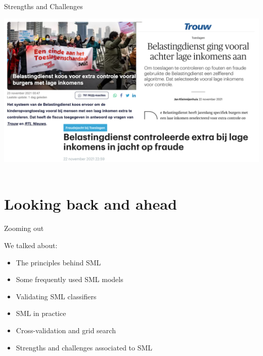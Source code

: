\documentclass[handout]{beamer}
\begin{document}
\begin{frame}{Strengths and Challenges}
	\begin{center}
		\includegraphics[width=\linewidth,height=\textheight,keepaspectratio]{../pictures/toeslagenaffaire_headlines.png} \\\
	\end{center}
	
	
\end{frame}


\section{Looking back and ahead}

\begin{frame}{Zooming out} 
	
	We talked about:
	\begin{itemize}
		\item The principles behind SML
		\item Some frequently used SML models
		\item Validating SML classifiers
		\item SML in practice
		\item Cross-validation and grid search
		\item Strengths and challenges associated to SML \\\
\end{itemize}
	

\end{frame}
\end{document}

